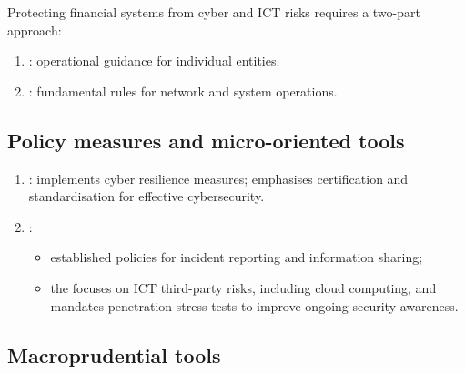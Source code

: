 
\begin{cidefbox}[title={Digital resilience}]
Protecting financial systems from cyber and ICT risks requires a two-part approach:
\begin{enumerate}
\item {}: operational guidance for individual entities.
\item {}: fundamental rules for network and system operations.
\end{enumerate}
\end{cidefbox}

\subsection*{Policy measures and micro-oriented tools}

\begin{enumerate}
\item {}: implements cyber resilience
measures; emphasises certification and standardisation for effective cybersecurity.
\item {}:
  \begin{itemize}
  \item established policies for incident reporting and information sharing;
  \item the  focuses on ICT third-party risks,
  including cloud computing, and mandates penetration stress tests to improve ongoing security
  awareness.
  \end{itemize}
\end{enumerate}

\subsection*{Macroprudential tools}


